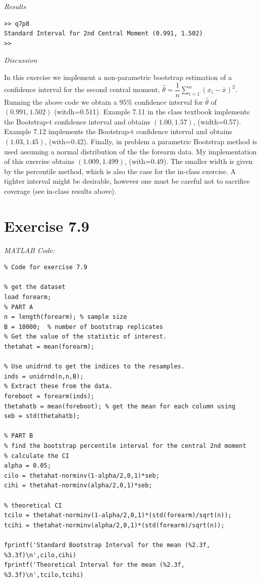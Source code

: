 \documentclass[12pt,a4paper]{article}
\begin{document}
\textit{Results}

\begin{verbatim}
>> q7p8
Standard Interval for 2nd Central Moment (0.991, 1.502)
>> 
\end{verbatim}

\textit{Discussion}

In this exercise we implement a non-parametric bootstrap estimation of a confidence interval for the second central moment, $\hat{\theta}=\dfrac{1}{n}\sum_{i=1}^n(x_i-\bar{x})^2$. Running the above code we obtain a $95\%$ confidence interval for $\hat{\theta}$ of $(0.991, 1.502)$ (witdh=0.511). Example 7.11 in the class textbook implements the Bootstrap-t confidence interval and obtains $(1.00, 1.57)$, (width=0.57). Example 7.12 implements the Bootstrap-t confidence interval and obtains $(1.03,1.45)$, (with=0.42). Finally, in problem a parametric Bootstrap method is used assuming a normal distribution of the the forearm data. My implementation of this exercise obtains $(1.009,1.499)$, (with=0.49). The smaller width is given by the percentile method, which is also the case for the in-class exercise. A tighter interval might be desirable, however one must be careful not to sacrifice coverage (see in-class results above).

\clearpage

\section*{Exercise 7.9}
\textit{MATLAB Code:}\\

\begin{verbatim}
% Code for exercise 7.9

% get the dataset
load forearm;
% PART A
n = length(forearm); % sample size
B = 10000;	% number of bootstrap replicates
% Get the value of the statistic of interest.
thetahat = mean(forearm);

% Use unidrnd to get the indices to the resamples.
inds = unidrnd(n,n,B);
% Extract these from the data.
foreboot = forearm(inds);
thetahatb = mean(foreboot); % get the mean for each column using
seb = std(thetahatb);

% PART B
% find the bootstrap percentile interval for the central 2nd moment
% calculate the CI
alpha = 0.05;
cilo = thetahat-norminv(1-alpha/2,0,1)*seb;
cihi = thetahat-norminv(alpha/2,0,1)*seb;

% theoretical CI
tcilo = thetahat-norminv(1-alpha/2,0,1)*(std(forearm)/sqrt(n));
tcihi = thetahat-norminv(alpha/2,0,1)*(std(forearm)/sqrt(n));

fprintf('Standard Bootstrap Interval for the mean (%2.3f, %3.3f)\n',cilo,cihi)
fprintf('Theoretical Interval for the mean (%2.3f, %3.3f)\n',tcilo,tcihi)
\end{verbatim}
\end{document}
